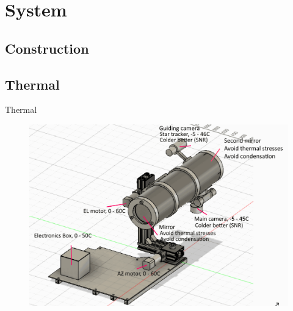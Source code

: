 \documentclass[11pt, aspectratio=169]{beamer}
\begin{document}
\section{System}
\subsection{Construction}

\subsection{Thermal}
\begin{frame}[c]{Thermal}
    \begin{figure}
        \includegraphics[height=1\textheight]{images/thermalsystem.png}
    \end{figure}
\end{frame}
\end{document}
